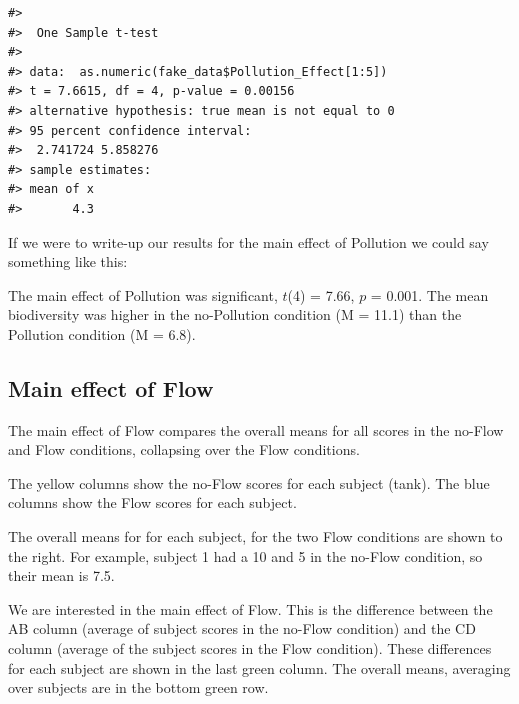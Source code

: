 \documentclass[
  letterpaper,
  DIV=11,
  numbers=noendperiod]{scrreprt}
\begin{document}
\begin{verbatim}
#> 
#>  One Sample t-test
#> 
#> data:  as.numeric(fake_data$Pollution_Effect[1:5])
#> t = 7.6615, df = 4, p-value = 0.00156
#> alternative hypothesis: true mean is not equal to 0
#> 95 percent confidence interval:
#>  2.741724 5.858276
#> sample estimates:
#> mean of x 
#>       4.3
\end{verbatim}

If we were to write-up our results for the main effect of Pollution we
could say something like this:

The main effect of Pollution was significant, \(t\)(4) = 7.66, \(p\) =
0.001. The mean biodiversity was higher in the no-Pollution condition (M
= 11.1) than the Pollution condition (M = 6.8).

\subsection{Main effect of Flow}\label{main-effect-of-flow}

The main effect of Flow compares the overall means for all scores in the
no-Flow and Flow conditions, collapsing over the Flow conditions.

The yellow columns show the no-Flow scores for each subject (tank). The
blue columns show the Flow scores for each subject.

The overall means for for each subject, for the two Flow conditions are
shown to the right. For example, subject 1 had a 10 and 5 in the no-Flow
condition, so their mean is 7.5.

We are interested in the main effect of Flow. This is the difference
between the AB column (average of subject scores in the no-Flow
condition) and the CD column (average of the subject scores in the Flow
condition). These differences for each subject are shown in the last
green column. The overall means, averaging over subjects are in the
bottom green row.
\end{document}
